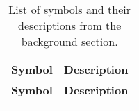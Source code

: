 
\pagestyle{empty}
\begin{longtable}{c p{10cm}}
    \caption{List of symbols and their descriptions from the background section.}\label{tab:symbols}                                                \\
    \hline
    \textbf{Symbol}                 & \textbf{Description}                                                                                          \\
    \hline
    \endfirsthead

    \hline
    \textbf{Symbol}                 & \textbf{Description}                                                                                          \\
    \hline
    \endhead

    \hline
    \endfoot

    \hline
    \endlastfoot


\end{longtable}
